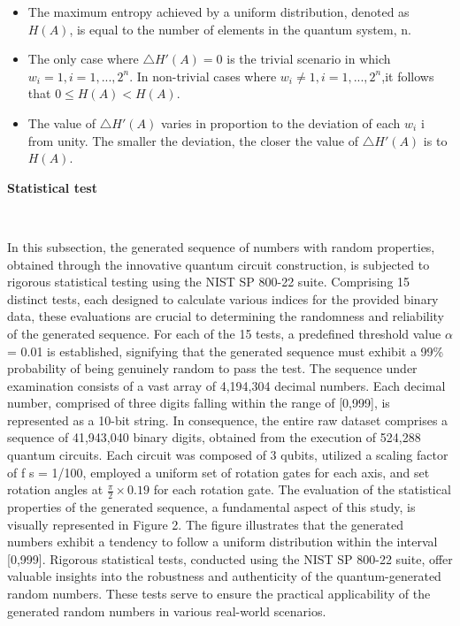 \documentclass[12pt]{article}
\begin{document}
	   		\begin{itemize}
	   			\item The maximum entropy achieved by a uniform distribution, denoted as $H(A)$, is equal to the number of elements in the
	   			quantum system, n.
	   			\item The only case where $\triangle H'(A) = 0$ is the trivial scenario in which $w_i=1, 
	   			i=1,...,2^n$. In non-trivial cases where $w_i\neq1,	i=1,...,2^n$,it follows that
	   			$ 0 \leq H(A) < H(A)$. 
	   			\item The value of $\triangle H'(A)$ varies in proportion to the deviation of each $w_i$ i from unity. The smaller the deviation, the closer the
	   			value of  $\triangle H'(A)$ is to $H(A)$.
	   		\end{itemize}
	   		
	   		{\raggedright\large\textbf{Statistical test}}\\\par
	   		{In this subsection, the generated sequence of numbers with random properties, obtained through the innovative quantum circuit
	   			construction, is subjected to rigorous statistical testing using the NIST SP 800-22 suite. Comprising 15 distinct tests, each
	   			designed to calculate various indices for the provided binary data, these evaluations are crucial to determining the randomness
	   			and reliability of the generated sequence.
	   			For each of the 15 tests, a predefined threshold value $\alpha$ = 0.01 is established, signifying that the generated sequence must
	   			exhibit a 99\% probability of being genuinely random to pass the test. The sequence under examination consists of a vast
	   			array of 4,194,304 decimal numbers. Each decimal number, comprised of three digits falling within the range of [0,999], is
	   			represented as a 10-bit string. In consequence, the entire raw dataset comprises a sequence of 41,943,040 binary digits, obtained
	   			from the execution of 524,288 quantum circuits. Each circuit was composed of 3 qubits, utilized a scaling factor of f s = 1/100,
	   			employed a uniform set of rotation gates for each axis, and set rotation angles at $\frac{\pi}{2}\times0.19$ for each rotation gate.
	   			The evaluation of the statistical properties of the generated sequence, a fundamental aspect of this study, is visually
	   			represented in Figure 2. The figure illustrates that the generated numbers exhibit a tendency to follow a uniform distribution
	   			within the interval [0,999]. Rigorous statistical tests, conducted using the NIST SP 800-22 suite, offer valuable insights into the
	   			robustness and authenticity of the quantum-generated random numbers. These tests serve to ensure the practical applicability of
	   			the generated random numbers in various real-world scenarios.}\\
	   		
\end{document}
